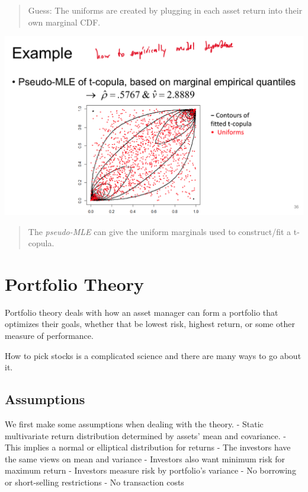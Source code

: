 \documentclass[
  oneside]{book}
\begin{document}
\begin{quote}
Guess: The uniforms are created by plugging in each asset return into their own marginal CDF.
\end{quote}

\includegraphics{Notes/Obsidian-Attachments/4-Multivariate-Return-Modelling-15.png}

\begin{quote}
The \emph{pseudo-MLE} can give the uniform marginals used to construct/fit a t-copula.
\end{quote}

\hypertarget{portfolio-theory}{%
\chapter{Portfolio Theory}\label{portfolio-theory}}

Portfolio theory deals with how an asset manager can form a portfolio that optimizes their goals, whether that be lowest risk, highest return, or some other measure of performance.

How to pick stocks is a complicated science and there are many ways to go about it.

\hypertarget{assumptions}{%
\section{Assumptions}\label{assumptions}}

We first make some assumptions when dealing with the theory.
- Static multivariate return distribution determined by assets' mean and covariance.
- This implies a normal or elliptical distribution for returns
- The investors have the same views on mean and variance
- Investors also want minimum risk for maximum return
- Investors measure risk by portfolio's variance
- No borrowing or short-selling restrictions
- No transaction costs
\end{document}
